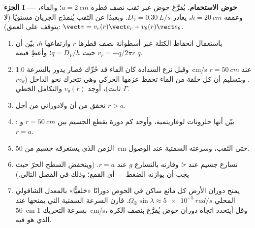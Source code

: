 \begin{problem}
\label{pb:b2:fluid-kinematics:1}

\medskip
\noindent\textbf{الجزء I --- حوض الاستحمام.}
يُفرَّغ حوض عبر ثقب نصف قطره $a = \qty{2}{cm}$؛ والماء، وعمقه
$h = \qty{20}{cm}$، يغادر  $D_V =
\qty{0.30}{L/s}$. وبعيدًا عن الثقب يُنمذَج الجريان مستويًا
(لا يتوقف على العمق): $\vect v = v_r(r)\vect e_r + v_\theta(r)\vect e_\theta$.
\begin{enumerate}
  \item باستعمال انحفاظ الكتلة عبر أسطوانة نصف قطرها $r$
        وارتفاعها $h$، بيّن أن $v_r = -q/2\pi r$ حيث $q = D_V/h$؛
        وأعطِ قيمة $q$.
  \item وقبل نزع السدادة كان الماء قد حُرِّك فصار يدور بالسرعة
        \qty{1.0}{cm/s} عند $r = \qty{50}{cm}$. وبتسليم أن كل حلقة من
        الماء تحفظ عزمها الحركي وهي تتحرك نحو الداخل ($rv_\theta$
        ثابت)، أوجد $v_\theta(r)$ والتكامل الخطي $\Gamma$.
  \item تحقق من أن  ولادوراني من أجل
        $r > a$.
  \item {}: بيّن أنها حلزونات لوغاريتمية، وأوجد كم
        دورة يقطع الجسيم بين $r = \qty{50}{cm}$ و
        $r = a$.
  \item الزمن الذي يستغرقه جسيم من \qty{50}{cm} حتى الثقب،
        وسرعته السمتية عند الوصول.
  \item تسارع جسيم عند $r$؛ وقارنه بالتسارع $g$ عند $r = a$.
        (وينخفض السطح الحرّ حيث يجب أن يوازنه الضغط ---
        أي القمع؛ وذلك في الفصل التالي.)
  \item يمنح دوران الأرض كل مائع ساكن في الحوض دورانًا
        «خلفيًّا» بالمعدل الشاقولي المحلي
        $\Omega_\oplus\sin\lambda \approx \qty{5e-5}{rad/s}$. قارن السرعة
        السمتية التي يمنحها عند \qty{50}{cm} بسرعة التحريك
        \qty{1}{cm/s}، وقل أيتحدد اتجاه دوران حوض يُفرَّغ بنصف
        الكرة الذي هو فيه.
\end{enumerate}


\end{problem}
